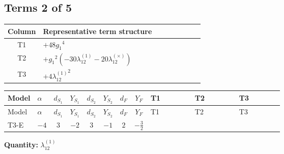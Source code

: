 \documentclass[8pt]{article}
\begin{document}
\begin{landscape}
\subsection*{Terms 2 of 5}
\begin{center}
\begin{tabular}{@{}c >{\raggedright\arraybackslash}p{0.82\linewidth}@{}}
\toprule
Column & Representative term structure \\
\midrule
T1 & \(\displaystyle +48 {g_1}^4\) \\
\midrule
T2 & \(\displaystyle +{g_1}^2 (-30 {\lambda_{12}^{(1)}}-20 {\lambda_{12}^{(\times)}})\) \\
\midrule
T3 & \(\displaystyle +4 {\lambda_{12}^{(1)}}^2\) \\
\midrule
\bottomrule
\end{tabular}
\end{center}
\smallskip
\tiny
\begin{longtable}{@{}llcccccc >{\raggedright\arraybackslash}p{0.21\linewidth} >{\raggedright\arraybackslash}p{0.21\linewidth} >{\raggedright\arraybackslash}p{0.21\linewidth}@{}}
\toprule
Model & $\alpha$ & $d_{S_1}$ & $Y_{S_1}$ & $d_{S_2}$ & $Y_{S_2}$ & $d_F$ & $Y_F$ & T1 & T2 & T3 \\
\midrule
\endfirsthead
\toprule
Model & $\alpha$ & $d_{S_1}$ & $Y_{S_1}$ & $d_{S_2}$ & $Y_{S_2}$ & $d_F$ & $Y_F$ & T1 & T2 & T3 \\
\midrule
\endhead
T3-E & $-4$ & $3$ & $-2$ & $3$ & $-1$ & $2$ & $-\frac{3}{2}$ & \scriptsize\adjustbox{max width=\linewidth}{$\begin{gathered} +48 {g_1}^4\end{gathered}$} & \scriptsize\adjustbox{max width=\linewidth}{$\begin{gathered} +{g_1}^2 (-30 {\lambda_{12}^{(1)}}-20 {\lambda_{12}^{(\times)}})\end{gathered}$} & \scriptsize\adjustbox{max width=\linewidth}{$\begin{gathered} +4 {\lambda_{12}^{(1)}}^2\end{gathered}$} \\
\midrule
\bottomrule
\end{longtable}
\clearpage
\noindent\textbf{Quantity: }$\lambda_{12}^{(1)}$\par\smallskip

\end{landscape}
\end{document}
